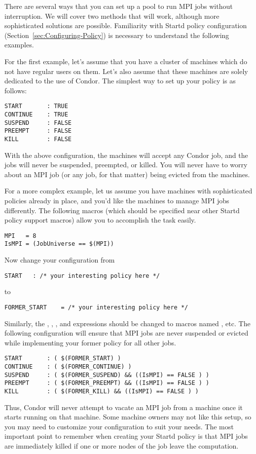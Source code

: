 There are several ways that you can set up a pool to run MPI jobs without 
interruption.  We will cover two methods that will work, although more
sophisticated solutions are possible. 
Familiarity with Startd policy configuration
(Section~\ref{sec:Configuring-Policy}) is necessary to understand the
following examples.

For the first example, let's assume that you have a cluster of machines which
do not have regular users on them.  Let's also assume that these machines are 
solely dedicated to the use of Condor.  
The simplest way to set up your policy is as follows:
\begin{verbatim}
START       : TRUE
CONTINUE    : TRUE
SUSPEND     : FALSE
PREEMPT     : FALSE
KILL        : FALSE
\end{verbatim}

With the above configuration, the machines will accept any Condor job, and the
jobs will never be suspended, preempted, or killed.  You will never have to 
worry about an MPI job (or any job, for that matter) being evicted from the 
machines.

For a more complex example, let us assume you have machines with sophisticated 
policies already in place, and you'd like the machines to manage MPI jobs 
differently.  The following macros (which should be specified
near other Startd policy support macros) allow you to accomplish the task 
easily.
\begin{verbatim}
MPI	  = 8
IsMPI = (JobUniverse == $(MPI))
\end{verbatim}
Now change your configuration from
\begin{verbatim}
START	: /* your interesting policy here */
\end{verbatim}
to 
\begin{verbatim}
FORMER_START	= /* your interesting policy here */
\end{verbatim}
Similarly, the , , , and 
 expressions should be changed to macros named 
, etc.  The following configuration will ensure that
MPI jobs are never suspended or evicted while implementing your former policy
for all other jobs.
\begin{verbatim}
START		: ( $(FORMER_START) )
CONTINUE	: ( $(FORMER_CONTINUE) )
SUSPEND		: ( $(FORMER_SUSPEND) && ((IsMPI) == FALSE ) )
PREEMPT		: ( $(FORMER_PREEMPT) && ((IsMPI) == FALSE ) )
KILL		: ( $(FORMER_KILL) && ((IsMPI) == FALSE ) )
\end{verbatim}
Thus, Condor will never attempt to vacate an MPI job from a machine once 
it starts running on that machine.  
Some machine owners may not like this setup, so you may need to customize 
your configuration to suit your needs.  
The most important point to remember when creating your Startd policy is 
that MPI jobs are immediately killed if one or more nodes of the job leave
the computation.

